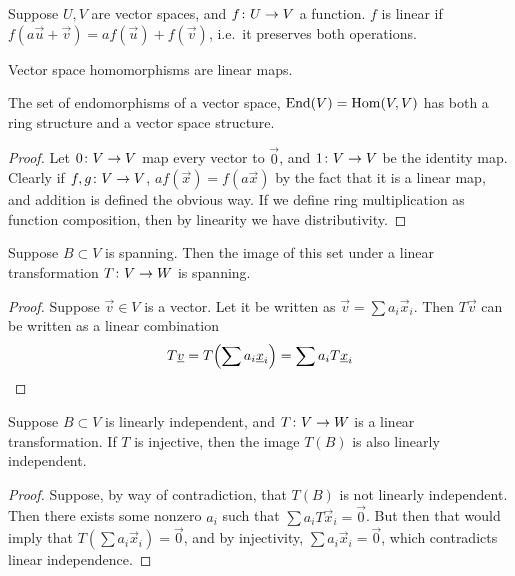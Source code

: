 \begin{definition}
    Suppose \(U,V\) are vector spaces, and \(f\colon U\to V\) a function.
    \(f\) is linear if \(f(a\vec{u}+\vec{v}) = af(\vec{u}) + f(\vec{v})\),
    i.e.\ it preserves both operations.
\end{definition}
\begin{definition}
    Vector space homomorphisms are linear maps.
\end{definition}
\begin{proposition}
    The set of endomorphisms of a vector space, \(\operatorname{End}(V) = \operatorname{Hom}(V,V)\)
    has both a ring structure and a vector space structure.
\end{proposition}
\begin{proof}
    Let \(0\colon V\to V\) map every vector to \(\vec{0}\),
    and \(1\colon V\to V\) be the identity map.
    Clearly if \(f,g\colon V\to V\),
    \(af(\vec{x}) = f(a\vec{x})\) by the fact that it is a linear map,
    and addition is defined the obvious way.
    If we define ring multiplication as function composition,
    then by linearity we have distributivity.
\end{proof}

\begin{proposition}\label{prop:image-spanning}
    Suppose \(B \subset V\) is spanning.
    Then the image of this set under a linear transformation \(T\colon V\to W\) is spanning.
\end{proposition}
\begin{proof}
    Suppose \(\vec{v} \in V\) is a vector.
    Let it be written as \(\vec{v} = \sum a_i\vec{x}_i\).
    Then \(T\vec{v}\) can be written as a linear combination
    \begin{equation*}
        T\vec{v} = T\pqty{\sum a_i\vec{x}_i} = \sum a_i T\vec{x}_i
    \end{equation*}
\end{proof}
\begin{proposition}\label{prop:image-lin-indep}
    Suppose \(B \subset V\) is linearly independent,
    and \(T\colon V\to W\) is a linear transformation.
    If \(T\) is injective, then the image \(T(B)\) is also linearly independent.
\end{proposition}
\begin{proof}
    Suppose, by way of contradiction,
    that \(T(B)\) is not linearly independent.
    Then there exists some nonzero \(a_i\) such that
    \(\sum a_i T\vec{x}_i = \vec{0}\).
    But then that would imply that \(T(\sum a_i\vec{x}_i) = \vec{0}\),
    and by injectivity, \(\sum a_i\vec{x}_i = \vec{0}\),
    which contradicts linear independence.
\end{proof}


